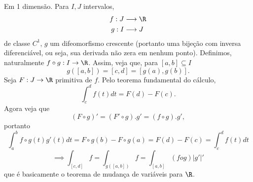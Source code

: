 \begin{intuition}
    Em 1 dimensão. Para $I,J$ intervalos, 
    \begin{align*}
        f: J &\longrightarrow \R \\
        g: I &\longrightarrow J \\
    \end{align*}
    de classe $C^{1}$, $g$ um difeomorfismo crescente (portanto uma bijeção com inversa diferenciável, ou seja, sua derivada não zera em nenhum ponto). Definimos, naturalmente $f\circ g : I\to \R$. Assim, veja que, para $\left[ a,b \right] \subseteq I$\[
    g\left( \left[ a,b \right] \right) = \left[ c,d \right] = \left[ g\left( a \right) ,g\left( b \right)  \right] 
    .\] Seja $F: J\to \R$ primitiva de $f$. Pelo teorema fundamental do cálculo, \[
    \int_c^{d}f\left( t \right) dt = F\left( d \right) -F\left( c \right) 
    .\] Agora veja que \[
    \left( F \circ  g \right) ' = \left( F' \circ  g \right) . g' = \left( f \circ  g \right) . g'
    ,\] portanto \[
    \int_a^{b} f \circ  g \left( t \right) g'\left( t \right) dt = F \circ  g\left( b \right) - F \circ  g \left( a \right) = F\left( d \right) - F\left( c \right) = \int_c^{d}f\left( t \right) dt
    \] \[
    \implies \int_{\left[ c,d \right] } f = \int_{g\left( \left[ a,b \right]  \right) } f = \int_{\left[ a,b \right] } \left( f o g \right) \left| g' \right| '
    \] que é basicamente o teorema de mudança de variáveis para $\R$.
\end{intuition}


